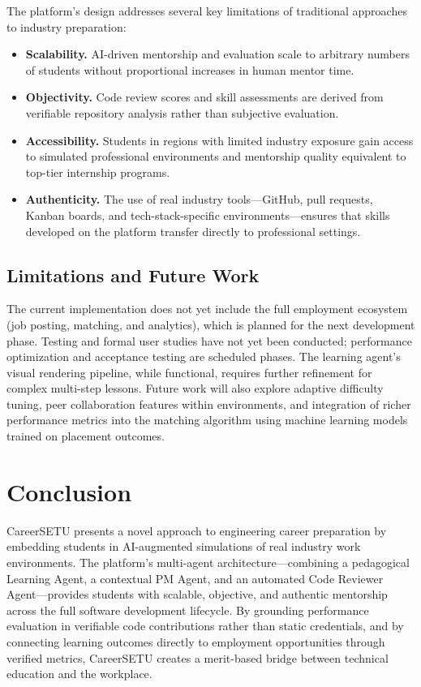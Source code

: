 \documentclass[runningheads]{llncs}
\begin{document}
The platform's design addresses several key limitations of traditional approaches to industry preparation:

\begin{itemize}
    \item \textbf{Scalability.} AI-driven mentorship and evaluation scale to arbitrary numbers of students without proportional increases in human mentor time.
    \item \textbf{Objectivity.} Code review scores and skill assessments are derived from verifiable repository analysis rather than subjective evaluation.
    \item \textbf{Accessibility.} Students in regions with limited industry exposure gain access to simulated professional environments and mentorship quality equivalent to top-tier internship programs.
    \item \textbf{Authenticity.} The use of real industry tools---GitHub, pull requests, Kanban boards, and tech-stack-specific environments---ensures that skills developed on the platform transfer directly to professional settings.
\end{itemize}

\subsection{Limitations and Future Work}

The current implementation does not yet include the full employment ecosystem (job posting, matching, and analytics), which is planned for the next development phase. Testing and formal user studies have not yet been conducted; performance optimization and acceptance testing are scheduled phases. The learning agent's visual rendering pipeline, while functional, requires further refinement for complex multi-step lessons. Future work will also explore adaptive difficulty tuning, peer collaboration features within environments, and integration of richer performance metrics into the matching algorithm using machine learning models trained on placement outcomes.

\section{Conclusion}
\label{sec:conclusion}

CareerSETU presents a novel approach to engineering career preparation by embedding students in AI-augmented simulations of real industry work environments. The platform's multi-agent architecture---combining a pedagogical Learning Agent, a contextual PM Agent, and an automated Code Reviewer Agent---provides students with scalable, objective, and authentic mentorship across the full software development lifecycle. By grounding performance evaluation in verifiable code contributions rather than static credentials, and by connecting learning outcomes directly to employment opportunities through verified metrics, CareerSETU creates a merit-based bridge between technical education and the workplace.
\end{document}

